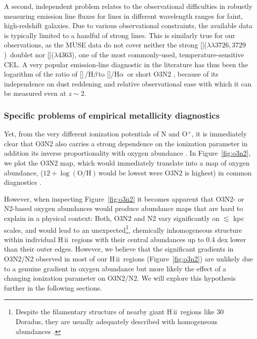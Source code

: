 \documentclass[traditabstract]{aa}
\newcommand{\hb}{H$\beta$}
\newcommand{\ha}{H$\alpha$}
\newcommand{\hii}{\mbox{H\,{\sc ii}}}
\newcommand{\oh}{$12+\log(\mathrm{O/H})$}
\newcommand{\oii}{[\ion{O}{ii}]}
\newcommand{\oiii}{[\ion{O}{iii}]}
\newcommand{\nii}{[\ion{N}{ii}]}
\begin{document}
A second, independent problem relates to the observational difficulties in robustly measuring emission line fluxes for lines in different wavelength ranges for faint, high-redshift galaxies. Due to various observational constraints, the available data is typically limited to a handful of strong lines. This is similarly true for our observations, as the MUSE data do not cover neither the strong \oii($\lambda\lambda3726,3729$)~doublet nor \oiii($\lambda 4363$), one of the most commonly-used, temperature-sensitive CEL. A very popular emission-line diagnostic in the literature has thus been the logarithm of the ratio of \oiii\,/\hb\,to \nii/\ha\, or short O3N2 \citep[e.g.,][]{2004MNRAS.348L..59P, 2013A&A...559A.114M}, because of its independence on dust reddening and relative observational ease with which it can be measured even at $z\sim 2$.

\subsubsection{Specific problems of empirical metallicity diagnostics}

Yet, from the very different ionization potentials of N and O$^{+}$, it is immediately clear that O3N2 also carries a strong dependence on the ionization parameter in addition its inverse proportionality with oxygen abundance \citep[e.g.,][]{1979A&A....78..200A, 2015MNRAS.448.2030H}. In Figure~\ref{fig:o3n2}, we plot the O3N2 map, which would immediately translate into a map of oxygen abundance, (\oh\,would be lowest were O3N2 is highest) in common diagnostics \citep{2004MNRAS.348L..59P}.

However, when inspecting Figure~\ref{fig:o3n2} it becomes apparent that O3N2- or N2-based oxygen abundances would produce abundance maps that are hard to explain in a physical context: Both, O3N2 and N2 vary significantly on $\lesssim$ kpc scales, and would lead to an unexpected\footnote{Despite the filamentary structure of nearby giant \hii~regions like 30 Doradus, they are usually adequately described with homogeneous abundances \citep[e.g.,][and references therein]{2011ApJ...738...34P}.}, chemically inhomogeneous structure within individual \hii~regions with their central abundances up to 0.4 dex lower than their outer edges. However, we believe that the significant gradients in O3N2/N2 observed in most of our \hii~regions (Figure~\ref{fig:o3n2}) are unlikely due to a genuine gradient in oxygen abundance but more likely the effect of a changing ionization parameter on O3N2/N2. We will explore this hypothesis further in the following sections.
\end{document}

